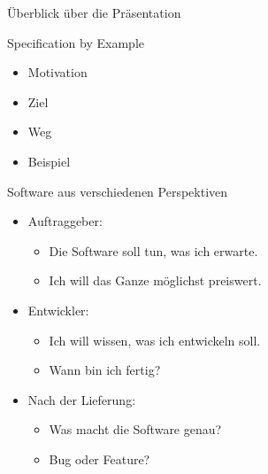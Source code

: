 \begin{frame}{Überblick über die Präsentation}

\Large{Specification by Example}

\vspace{2em}

\begin{itemize}
	\item Motivation

	\item Ziel

	\item Weg

	\item Beispiel
\end{itemize}

\end{frame}


\begin{frame}{Software aus verschiedenen Perspektiven}

\begin{itemize}

	
	\item Auftraggeber:

	\begin{itemize}
		\item \glqq Die Software soll tun, was ich erwarte.\grqq
		\item \glqq Ich will das Ganze möglichst preiswert.\grqq
	\end{itemize}
	
	
	\item Entwickler:
	
	\begin{itemize}
		\item \glqq Ich will wissen, was ich entwickeln soll.\grqq
		\item \glqq Wann bin ich fertig?\grqq
	\end{itemize}
	
	
	\item Nach der Lieferung:
	
	\begin{itemize}
		\item \glqq Was macht die Software genau?\grqq
		\item \glqq Bug oder Feature?\grqq
	\end{itemize}
\end{itemize}

\end{frame}


